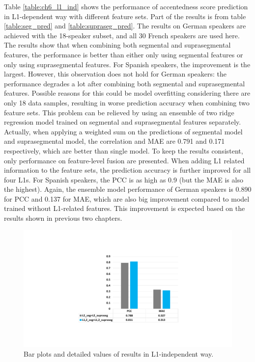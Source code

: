 Table \ref{table:ch6_l1_ind} shows the performance of accentedness score prediction in L1-dependent way with different feature sets. Part of the results is from table \ref{table:seg_pred} and \ref{table:supraseg_pred}. The results on German speakers are achieved with the 18-speaker subset, and all 30 French speakers are used here. The results show that when combining both segmental and suprasegmental features, the performance is better than either only using segmental features or only using suprasegmental features. For Spanish speakers, the improvement is the largest. However, this observation does not hold for German speakers: the performance degrades a lot after combining both segmental and suprasegmental features. Possible reasons for this could be model overfitting considering there are only 18 data samples, resulting in worse prediction accuracy when combining two feature sets. This problem can be relieved by using an ensemble of two ridge regression model trained on segmental and suprasegmental features separately. Actually, when applying a weighted sum on the predictions of segmental model and suprasegmental model, the correlation and MAE are 0.791 and 0.171 respectively, which are better than single model. To keep the results consistent, only performance on feature-level fusion are presented. When adding L1 related information to the feature sets, the prediction accuracy is further improved for all four L1s. For Spanish speakers, the PCC is as high as 0.9 (but the MAE is also the highest). Again, the ensemble model performance of German speakers is 0.890 for PCC and 0.137 for MAE, which are also big improvement compared to model trained without L1-related features. This improvement is expected based on the results shown in previous two chapters.

\begin{figure}[t]
        \begin{minipage}[t]{1.0\linewidth}
        \centering
            \includegraphics[width=5.0in]{figures/allspk_results.pdf}
        \end{minipage}%
        \caption{Bar plots and detailed values of results in L1-independent way.}
        \centering
        \label{fig:allspk_results}
     \end{figure}

